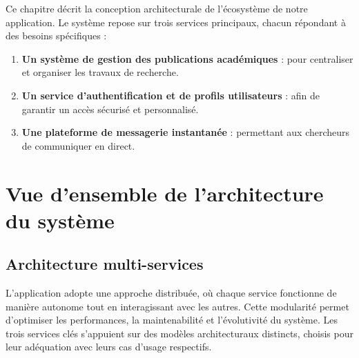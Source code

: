 \documentclass[12pt]{rapportPfe}
\begin{document}
Ce chapitre décrit la conception architecturale de l'écosystème de notre application. Le système repose sur trois services principaux, chacun répondant à des besoins spécifiques :

\begin{enumerate}
    \item \textbf{Un système de gestion des publications académiques} : pour centraliser et organiser les travaux de recherche.
    
    \item \textbf{Un service d’authentification et de profils utilisateurs} : afin de garantir un accès sécurisé et personnalisé.
    
    \item \textbf{Une plateforme de messagerie instantanée} : permettant aux chercheurs de communiquer en direct.
    
\end{enumerate}

\section{Vue d’ensemble de l’architecture du système}

\subsection{Architecture multi-services}

L’application adopte une approche distribuée, où chaque service fonctionne de manière autonome tout en interagissant avec les autres. Cette modularité permet d’optimiser les performances, la maintenabilité et l’évolutivité du système. Les trois services clés s’appuient sur des modèles architecturaux distincts, choisis pour leur adéquation avec leurs cas d’usage respectifs.
\end{document}
